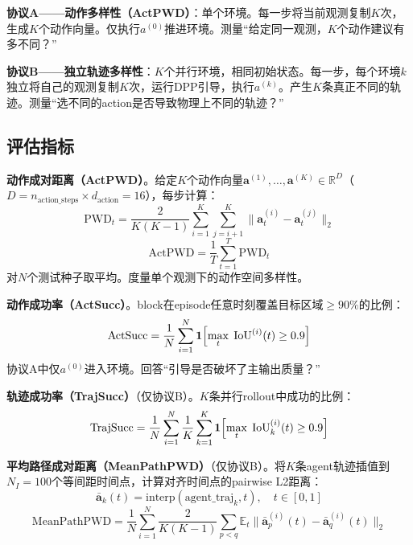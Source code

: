 \documentclass[11pt]{article}
\begin{document}
\textbf{协议A——动作多样性（ActPWD）}：单个环境。每一步将当前观测复制$K$次，生成$K$个动作向量。仅执行$a^{(0)}$推进环境。测量“给定同一观测，$K$个动作建议有多不同？”

\textbf{协议B——独立轨迹多样性}：$K$个并行环境，相同初始状态。每一步，每个环境$k$独立将自己的观测复制$K$次，运行DPP引导，执行$a^{(k)}$。产生$K$条真正不同的轨迹。测量“选不同的action是否导致物理上不同的轨迹？”

\subsection{评估指标}

\textbf{动作成对距离（ActPWD）}。给定$K$个动作向量$\mathbf{a}^{(1)}, \dots, \mathbf{a}^{(K)} \in \mathbb{R}^{D}$（$D = n_{\text{action\_steps}} \times d_{\text{action}} = 16$），每步计算：
\begin{equation}
\text{PWD}_t = \frac{2}{K(K-1)} \sum_{i=1}^{K} \sum_{j=i+1}^{K} \|\mathbf{a}^{(i)}_t - \mathbf{a}^{(j)}_t\|_2
\end{equation}
\begin{equation}
\text{ActPWD} = \frac{1}{T} \sum_{t=1}^{T} \text{PWD}_t
\end{equation}
对$N$个测试种子取平均。度量单个观测下的动作空间多样性。

\textbf{动作成功率（ActSucc）}。block在episode任意时刻覆盖目标区域$\geq 90\%$的比例：
\begin{equation}
\text{ActSucc} = \frac{1}{N} \sum_{i=1}^{N} \mathbf{1}\Bigl[\max_t\; \text{IoU}^{(i)}(t) \geq 0.9\Bigr]
\end{equation}
协议A中仅$a^{(0)}$进入环境。回答“引导是否破坏了主输出质量？”

\textbf{轨迹成功率（TrajSucc）}（仅协议B）。$K$条并行rollout中成功的比例：
\begin{equation}
\text{TrajSucc} = \frac{1}{N} \sum_{i=1}^{N} \frac{1}{K} \sum_{k=1}^{K} \mathbf{1}\Bigl[\max_t\; \text{IoU}^{(i)}_k(t) \geq 0.9\Bigr]
\end{equation}

\textbf{平均路径成对距离（MeanPathPWD）}（仅协议B）。将$K$条agent轨迹插值到$N_I = 100$个等间距时间点，计算对齐时间点的pairwise L2距离：
\begin{equation}
\bar{\mathbf{a}}_k(t) = \text{interp}(\text{agent\_traj}_k, t), \quad t \in [0, 1]
\end{equation}
\begin{equation}
\text{MeanPathPWD} = \frac{1}{N} \sum_{i=1}^{N} \frac{2}{K(K-1)} \sum_{p<q} \mathbb{E}_{t} \|\bar{\mathbf{a}}^{(i)}_p(t) - \bar{\mathbf{a}}^{(i)}_q(t)\|_2
\end{equation}
\end{document}
